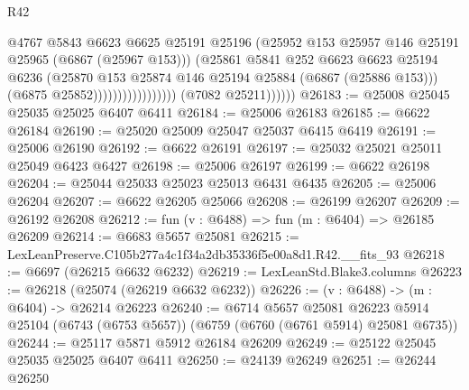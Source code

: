 \begin{lexlean}{R42}
\begin{coremodule}
{                                            @4767
                                            @5843
                                            @6623
                                            @6625
                                            @25191
                                            @25196
                                            (@25952
                                              @153
                                              @25957
                                              @146
                                              @25191
                                              @25965
                                              (@6867 (@25967 @153)))
                                            (@25861
                                              @5841
                                              @252
                                              @6623
                                              @6623
                                              @25194
                                              @6236
                                              (@25870
                                                @153
                                                @25874
                                                @146
                                                @25194
                                                @25884
                                                (@6867 (@25886 @153)))
                                              (@6875 @25852)))))))))))))))))
              (@7082 @25211))))))
@26183 := @25008 @25045 @25035 @25025 @6407 @6411
@26184 := @25006 @26183
@26185 := @6622 @26184
@26190 := @25020 @25009 @25047 @25037 @6415 @6419
@26191 := @25006 @26190
@26192 := @6622 @26191
@26197 := @25032 @25021 @25011 @25049 @6423 @6427
@26198 := @25006 @26197
@26199 := @6622 @26198
@26204 := @25044 @25033 @25023 @25013 @6431 @6435
@26205 := @25006 @26204
@26207 := @6622 @26205 @25066
@26208 := @26199 @26207
@26209 := @26192 @26208
@26212 := fun (v : @6488) => fun (m : @6404) => @26185 @26209
@26214 := @6683 @5657 @25081
@26215 := LexLeanPreserve.C105b277a4c1f34a2db35336f5e00a8d1.R42.__fits_93
@26218 := @6697 (@26215 @6632 @6232)
@26219 := LexLeanStd.Blake3.columns
@26223 := @26218 (@25074 (@26219 @6632 @6232))
@26226 := (v : @6488) -> (m : @6404) -> @26214 @26223
@26240 := @6714
    @5657
    @25081
    @26223
    @5914
    @25104
    (@6743 (@6753 @5657))
    (@6759 (@6760 (@6761 @5914) @25081 @6735))
@26244 := @25117 @5871 @5912 @26184 @26209
@26249 := @25122 @25045 @25035 @25025 @6407 @6411
@26250 := @24139 @26249
@26251 := @26244 @26250
}
\end{coremodule}
\end{lexlean}
